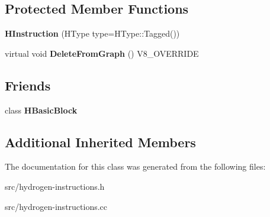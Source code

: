 \subsection*{Protected Member Functions}
\begin{DoxyCompactItemize}
\item 
\hypertarget{classv8_1_1internal_1_1_h_instruction_a5e199eeb1213e9c24ce0056cc7660e73}{}{\bfseries H\+Instruction} (H\+Type type=H\+Type\+::\+Tagged())\label{classv8_1_1internal_1_1_h_instruction_a5e199eeb1213e9c24ce0056cc7660e73}

\item 
\hypertarget{classv8_1_1internal_1_1_h_instruction_ab4b30eb966bfca5d8df0a8596e00518e}{}virtual void {\bfseries Delete\+From\+Graph} () V8\+\_\+\+O\+V\+E\+R\+R\+I\+D\+E\label{classv8_1_1internal_1_1_h_instruction_ab4b30eb966bfca5d8df0a8596e00518e}

\end{DoxyCompactItemize}
\subsection*{Friends}
\begin{DoxyCompactItemize}
\item 
\hypertarget{classv8_1_1internal_1_1_h_instruction_a5478374b6d520142cfdd17f9f28605d3}{}class {\bfseries H\+Basic\+Block}\label{classv8_1_1internal_1_1_h_instruction_a5478374b6d520142cfdd17f9f28605d3}

\end{DoxyCompactItemize}
\subsection*{Additional Inherited Members}


The documentation for this class was generated from the following files\+:\begin{DoxyCompactItemize}
\item 
src/hydrogen-\/instructions.\+h\item 
src/hydrogen-\/instructions.\+cc\end{DoxyCompactItemize}
